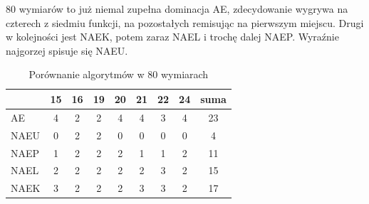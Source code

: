 \documentclass[12pt, a4paper]{article}
\begin{document}
80 wymiarów to już niemal zupełna dominacja AE, zdecydowanie wygrywa na czterech z siedmiu funkcji,
na pozostałych remisując na pierwszym miejscu. Drugi w kolejności jest NAEK, potem zaraz NAEL
i trochę dalej NAEP. Wyraźnie najgorzej spisuje się NAEU.

\begin{table}[H]
\centering
\begin{tabular}{ l | c | c | c | c | c | c | c | c}
         & 15  & 16 & 19 & 20 & 21 & 22 & 24 & suma \\ \hline
AE       & 4   & 2  & 2  & 4  & 4  & 3  & 4  & 23   \\ 
NAEU     & 0   & 2  & 2  & 0  & 0  & 0  & 0  & 4    \\ 
NAEP     & 1   & 2  & 2  & 2  & 1  & 1  & 2  & 11   \\ 
NAEL     & 2   & 2  & 2  & 2  & 2  & 3  & 2  & 15   \\
NAEK     & 3   & 2  & 2  & 2  & 3  & 3  & 2  & 17   \\ 
\end{tabular}
\caption{Porównanie algorytmów w 80 wymiarach}
\label{table:80d}
\end{table}
\end{document}
